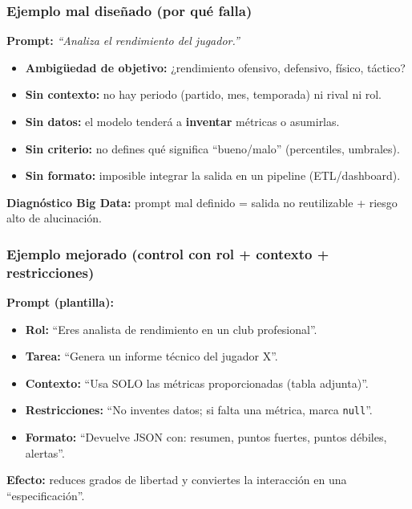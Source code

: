\documentclass[aspectratio=169]{beamer}
\begin{document}
\begin{frame}\frametitle{Ejemplo mal diseñado (por qué falla)}
\textbf{Prompt:} \textit{“Analiza el rendimiento del jugador.”}
\vspace{0.5em}

\begin{itemize}
    \item \textbf{Ambigüedad de objetivo:} ¿rendimiento ofensivo, defensivo, físico, táctico?
    \item \textbf{Sin contexto:} no hay periodo (partido, mes, temporada) ni rival ni rol.
    \item \textbf{Sin datos:} el modelo tenderá a \textbf{inventar} métricas o asumirlas.
    \item \textbf{Sin criterio:} no defines qué significa “bueno/malo” (percentiles, umbrales).
    \item \textbf{Sin formato:} imposible integrar la salida en un pipeline (ETL/dashboard).
\end{itemize}

\vspace{0.3em}
\textbf{Diagnóstico Big Data:} prompt mal definido = salida no reutilizable + riesgo alto de alucinación.
\end{frame}

\begin{frame}\frametitle{Ejemplo mejorado (control con rol + contexto + restricciones)}
\textbf{Prompt (plantilla):}
\begin{itemize}
    \item \textbf{Rol:} “Eres analista de rendimiento en un club profesional”.
    \item \textbf{Tarea:} “Genera un informe técnico del jugador X”.
    \item \textbf{Contexto:} “Usa SOLO las métricas proporcionadas (tabla adjunta)”.
    \item \textbf{Restricciones:} “No inventes datos; si falta una métrica, marca \texttt{null}”.
    \item \textbf{Formato:} “Devuelve JSON con: resumen, puntos fuertes, puntos débiles, alertas”.
\end{itemize}

\vspace{0.4em}
\textbf{Efecto:} reduces grados de libertad y conviertes la interacción en una “especificación”.
\end{frame}
\end{document}
